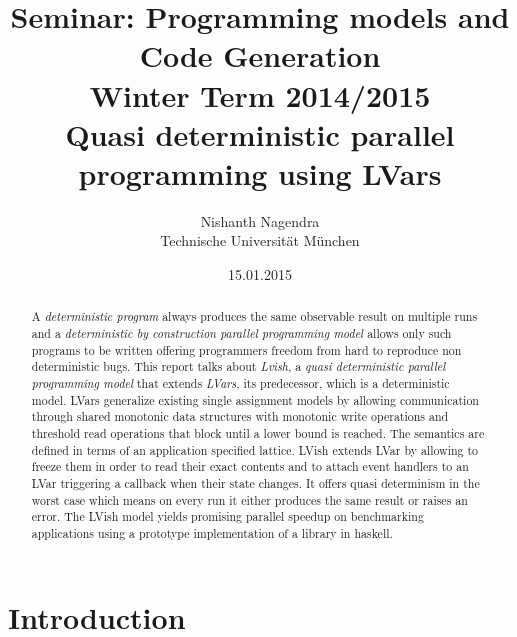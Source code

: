 \documentclass[twocolumn]{article}
\author{Nishanth Nagendra \\ Technische Universit\"at M\"unchen}
\title{Seminar: Programming models and Code Generation\\
       Winter Term 2014/2015\\
       {\bf Quasi deterministic parallel programming using LVars}
}
\date{15.01.2015}
\begin{document}
\maketitle

\begin{abstract}
A \textit{deterministic program} always produces the same observable result on multiple runs and a \textit{deterministic by construction parallel programming model} allows only such programs to be written offering programmers freedom from hard to reproduce non deterministic bugs. This report talks about \textit{Lvish}, a \textit{quasi deterministic parallel programming model} that extends \textit{LVars}, its predecessor, which is a deterministic model. LVars generalize existing single assignment models by allowing communication through shared monotonic data structures with monotonic write operations and threshold read operations that block until a lower bound is reached. The semantics are defined in terms of an application specified lattice. LVish extends LVar by allowing to freeze them in order to read their exact contents and to attach event handlers to an LVar triggering a callback when their state changes. It offers quasi determinism in the worst case which means on every run it either produces the same result or raises an error. The LVish model yields promising parallel speedup on benchmarking applications using a prototype implementation of a library in haskell.
\end{abstract}

\section{Introduction}

\label{introduction}
\end{document}
